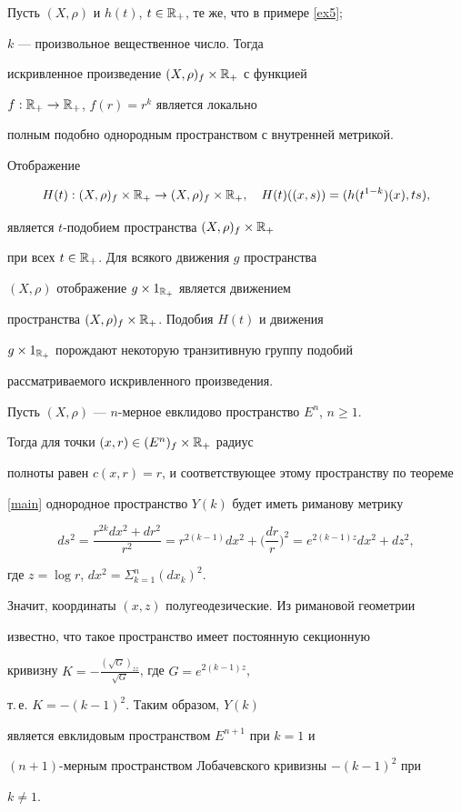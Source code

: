 \begin{exams}


\label{ex7}


Пусть $(X,\rho)$ и $h(t)$, $t \in \Bbb{R}_{+}$, те же, что в примере \ref{ex5};


$k$ --- произвольное вещественное число. Тогда


искривленное произведение $(X,\rho)_{f} \times \Bbb{R}_{+}$ с функцией


$f:\Bbb{R}_{+} \rightarrow \Bbb{R}_{+}$, $f(r)=r^{k}$ является локально


полным подобно однородным пространством с внутренней метрикой.


Отображение


$$


H(t):(X,\rho)_{f} \times \Bbb{R}_{+} \rightarrow


(X,\rho)_{f} \times \Bbb{R}_{+},\quad H(t)((x,s))= (h(t^{1-k})(x),ts),


$$


является $t$-подобием пространства $(X,\rho)_{f} \times \Bbb{R}_{+}$


при всех $t \in \Bbb{R}_{+}$. Для всякого движения $g$ пространства


$(X,\rho)$ отображение $g \times 1_{\Bbb{R}_{+}}$ является движением


пространства $(X,\rho)_{f} \times \Bbb{R}_{+}$. Подобия $H(t)$ и движения


$g \times 1_{\Bbb{R}_{+}}$ порождают некоторую транзитивную группу подобий


рассматриваемого искривленного произведения.





Пусть $(X,\rho)$ --- $n$-мерное евклидово пространство $E^{n}$, $n \geq 1$.


Тогда для точки $(x,r) \in (E^{n})_{f} \times \Bbb{R}_{+}$ радиус


полноты равен $c(x,r)=r$, и соответствующее этому пространству по теореме


\ref{main} однородное пространство $Y(k)$ будет иметь риманову метрику


$$


ds^{2}= \frac{r^{2k}dx^{2}+dr^{2}}{r^{2}}=


r^{2(k-1)}dx^{2}+\bigg(\frac{dr}{r}\bigg)^{2}= e^{2(k-1)z} dx^{2}+dz^{2},


$$


где $z= \log r$, $dx^{2}= \Sigma_{k=1}^{n} (dx_{k})^{2}$.


Значит, координаты $(x,z)$ полугеодезические. Из римановой геометрии


известно, что такое пространство имеет постоянную секционную


кривизну $K=-\frac{(\sqrt{G})_{zz}}{\sqrt{G}}$, где $G=e^{2(k-1)z}$,


т.\,е. $K= -(k-1)^{2}$. Таким образом, $Y(k)$


является евклидовым пространством $E^{n+1}$ при $k=1$ и


$(n+1)$-мерным пространством Лобачевского кривизны $-(k-1)^{2}$ при


$k \neq 1$.


\end{exams}
